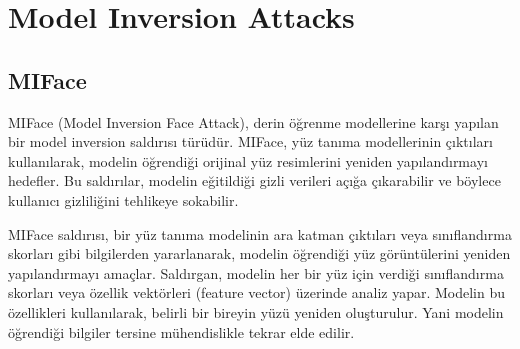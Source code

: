 \section{Model Inversion Attacks}

\subsection{MIFace}

MIFace (Model Inversion Face Attack), derin öğrenme modellerine karşı yapılan bir model inversion saldırısı türüdür. MIFace, yüz tanıma modellerinin çıktıları kullanılarak, modelin öğrendiği orijinal yüz resimlerini yeniden yapılandırmayı hedefler. Bu saldırılar, modelin eğitildiği gizli verileri açığa çıkarabilir ve böylece kullanıcı gizliliğini tehlikeye sokabilir.

MIFace saldırısı, bir yüz tanıma modelinin ara katman çıktıları veya sınıflandırma skorları gibi bilgilerden yararlanarak, modelin öğrendiği yüz görüntülerini yeniden yapılandırmayı amaçlar. Saldırgan, modelin her bir yüz için verdiği sınıflandırma skorları veya özellik vektörleri (feature vector) üzerinde analiz yapar. Modelin bu özellikleri kullanılarak, belirli bir bireyin yüzü yeniden oluşturulur. Yani modelin öğrendiği bilgiler tersine mühendislikle tekrar elde edilir.

\newpage